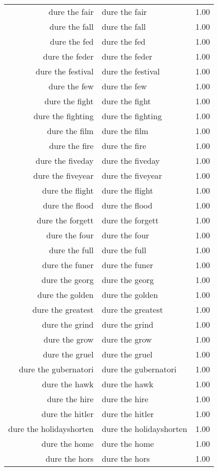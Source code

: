 \begin{table}[ht]
\begin{tabular}{rlr}
  dure the fair & dure the fair & 1.00 \\ 
  dure the fall & dure the fall & 1.00 \\ 
  dure the fed & dure the fed & 1.00 \\ 
  dure the feder & dure the feder & 1.00 \\ 
  dure the festival & dure the festival & 1.00 \\ 
  dure the few & dure the few & 1.00 \\ 
  dure the fight & dure the fight & 1.00 \\ 
  dure the fighting & dure the fighting & 1.00 \\ 
  dure the film & dure the film & 1.00 \\ 
  dure the fire & dure the fire & 1.00 \\ 
  dure the fiveday & dure the fiveday & 1.00 \\ 
  dure the fiveyear & dure the fiveyear & 1.00 \\ 
  dure the flight & dure the flight & 1.00 \\ 
  dure the flood & dure the flood & 1.00 \\ 
  dure the forgett & dure the forgett & 1.00 \\ 
  dure the four & dure the four & 1.00 \\ 
  dure the full & dure the full & 1.00 \\ 
  dure the funer & dure the funer & 1.00 \\ 
  dure the georg & dure the georg & 1.00 \\ 
  dure the golden & dure the golden & 1.00 \\ 
  dure the greatest & dure the greatest & 1.00 \\ 
  dure the grind & dure the grind & 1.00 \\ 
  dure the grow & dure the grow & 1.00 \\ 
  dure the gruel & dure the gruel & 1.00 \\ 
  dure the gubernatori & dure the gubernatori & 1.00 \\ 
  dure the hawk & dure the hawk & 1.00 \\ 
  dure the hire & dure the hire & 1.00 \\ 
  dure the hitler & dure the hitler & 1.00 \\ 
  dure the holidayshorten & dure the holidayshorten & 1.00 \\ 
  dure the home & dure the home & 1.00 \\ 
  dure the hors & dure the hors & 1.00 \\ 

\end{tabular}
\end{table}
